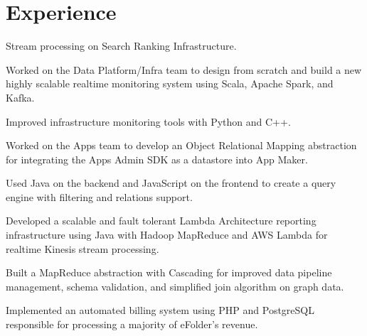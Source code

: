 \documentclass[]{resume}
\begin{document}
\begin{minipage}[t]{0.66\textwidth}


\section{Experience}

\vspace{\topsep} %
\begin{tightemize}
\item Stream processing on Search Ranking Infrastructure.
\end{tightemize}
\sectionsep

\begin{tightemize}
\item Worked on the Data Platform/Infra team to design from scratch and build
a new highly scalable realtime monitoring system using Scala, Apache Spark,
and Kafka.
\item Improved infrastructure monitoring tools with Python and C++.
\end{tightemize}
\sectionsep

\begin{tightemize}
\item Worked on the Apps team to develop an Object Relational Mapping
abstraction for integrating the Apps Admin SDK as a datastore into App Maker.
\item Used Java on the backend and JavaScript on the frontend to create a query
engine with filtering and relations support.
\end{tightemize}
\sectionsep

\begin{tightemize}
\item Developed a scalable and fault tolerant Lambda Architecture reporting
infrastructure using Java with Hadoop MapReduce and AWS Lambda for realtime
Kinesis stream processing.
\item Built a MapReduce abstraction with Cascading for improved data pipeline
management, schema validation, and simplified join algorithm on graph data.
\item Implemented an automated billing system using PHP and PostgreSQL
responsible for processing a majority of eFolder's revenue.
\end{tightemize}
\sectionsep


\end{minipage}
\end{document}
